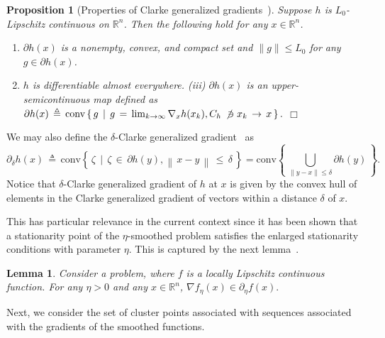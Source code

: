\documentclass[11pt,reqno]{amsart}
\newcommand{\1}{{\bf 1}}
\newcommand{\2}{{\bf 2}}
\newcommand{\us}[1]{\textcolor{red}{#1}}
\numberwithin{equation}{section}
\newtheorem{lemma}{Lemma}[section]
\newtheorem{proposition}{Proposition}[section]
\theoremstyle{remark}
\begin{document}
{	\begin{proposition}[Properties of Clarke generalized gradients~\cite{clarke98}] \em
		Suppose $h$ is $L_0$-Lipschitz continuous on $\mathbb{R}^n$. Then the following hold {for any $x \in \mathbb{R}^n$}.
		\begin{enumerate}
			\item[(i)] $\partial h(x)$ is a nonempty, convex, and compact  set and $\|g \| \leq {L_0}$ for any $g \in \partial h(x)$. 
			\item[(ii)] $h$ is differentiable almost everywhere.  (iii) $\partial h(x)$ is an upper-semicontinuous map defined as 
			$\partial h(x) \, \triangleq \, \mbox{conv}\left\{\, g \, \mid \, g \, = \, \lim_{k \to \infty} \nabla_{x} h(x_k), C_h \, \not \, \owns x_k \, \to \, x\, \right\}.$ $\Box$
		\end{enumerate}
	\end{proposition}
	We may also define the $\delta$-Clarke generalized gradient~\cite{goldstein77} as   
	\begin{equation}
		\partial_{\delta} h(x) \, \triangleq \, \mbox{conv}\left\{ \, \zeta\, \mid \, \zeta \, \in \, \partial h(y), \left\|\, x-y\, \right\|\, \leq \, \delta \,\right\} = \mbox{conv} \left\{ \, \bigcup_{\| y-x\| \le \delta } \partial h(y) \, \right\}. 
	\end{equation}
	Notice that $\delta$-Clarke generalized gradient of $h$ at $x$ is given by the convex hull of elements in the Clarke generalized gradient of vectors within a distance $\delta$ of $x$. {This has particular relevance in the current context since it has been shown that a stationarity point of the $\eta$-smoothed problem satisfies the enlarged stationarity conditions with parameter $\eta$. This is captured by the next lemma~\cite{goldstein77}.
		\begin{lemma}
			Consider  a problem, where $f$ is a locally Lipschitz continuous function. For any $\eta > 0$ and any $x \in \mathbb{R}^n$,  $\nabla f_{\eta}(x) \in \partial_{\eta} f(x).$ 
	\end{lemma}}
	
	Next, we consider the set of cluster points associated with sequences associated with the gradients of the smoothed functions. 
	
}
\end{document}
